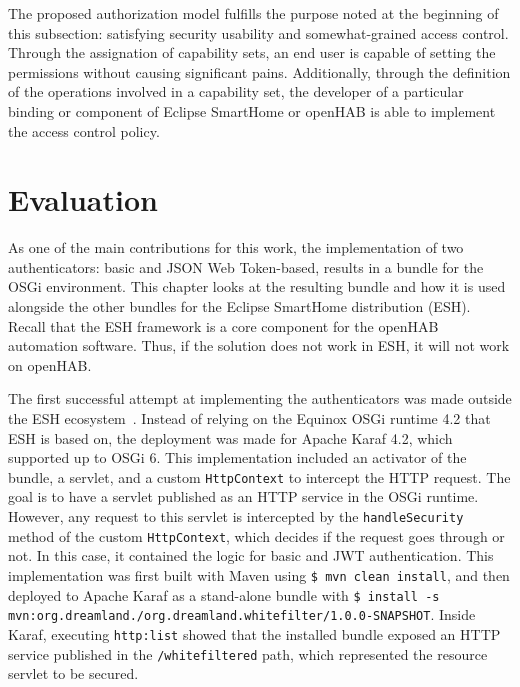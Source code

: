 \documentclass[12pt]{article}
\begin{document}
The proposed authorization model fulfills the purpose noted at the beginning of this subsection: satisfying security usability and somewhat-grained access control. Through the assignation of capability sets, an end user is capable of setting the permissions without causing significant pains. Additionally, through the definition of the operations involved in a capability set, the developer of a particular binding or component of Eclipse SmartHome or openHAB is able to implement the access control policy.

\newpage
\section{Evaluation}
\label{sec:eval}

As one of the main contributions for this work, the implementation of two authenticators: basic and JSON Web Token-based, results in a bundle for the OSGi environment. This chapter looks at the resulting bundle and how it is used alongside the other bundles for the Eclipse SmartHome distribution (ESH). Recall that the ESH framework is a core component for the openHAB automation software. Thus, if the solution does not work in ESH, it will not work on openHAB.

The first successful attempt at implementing the authenticators was made outside the ESH ecosystem~\cite{repo_extra}. Instead of relying on the Equinox OSGi runtime 4.2 that ESH is based on, the deployment was made for Apache Karaf 4.2, which supported up to OSGi 6. This implementation included an activator of the bundle, a servlet, and a custom \texttt{HttpContext} to intercept the HTTP request. The goal is to have a servlet published as an HTTP service in the OSGi runtime. However, any request to this servlet is intercepted by the \texttt{handleSecurity} method of the custom \texttt{HttpContext}, which decides if the request goes through or not. In this case, it contained the logic for basic and JWT authentication. This implementation was first built with Maven using \texttt{\$ mvn clean install}, and then deployed to Apache Karaf as a stand-alone bundle with \texttt{\$ install -s mvn:org.dreamland./org.dreamland.whitefilter/1.0.0-SNAPSHOT}. Inside Karaf, executing \texttt{http:list} showed that the installed bundle exposed an HTTP service published in the \texttt{/whitefiltered} path, which represented the resource servlet to be secured.
\end{document}

